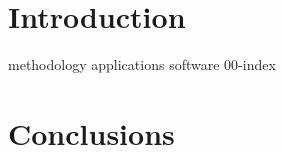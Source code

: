 \documentclass[11pt]{report}
\begin{document}

\makecover%


\clearpage
{}
\settableofcontents%
\tableofcontents


\clearpage
\setlistoffigures%
\listoffigures


\clearpage
\setlistoftables%
\listoftables





\chapter{Introduction}
\label{chap:introduction}


{methodology}
{applications}
{software}
{00-index}

\chapter{Conclusions}
\label{chap:conclusions}



\clearpage




\appendix






\makedisclaimer%
\end{document}
